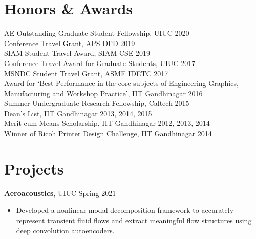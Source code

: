 \documentclass[margin]{res}
\begin{document}
\begin{resume}
\section{\large Honors \& Awards}
AE Outstanding Graduate Student Fellowship, UIUC \hfill 2020\vspace{0.1cm}\\
Conference Travel Grant, APS DFD \hfill 2019\vspace{0.1cm}\\
SIAM Student Travel Award, SIAM CSE \hfill 2019\vspace{0.1cm}\\
Conference Travel Award for Graduate Students, UIUC \hfill 2017\vspace{0.1cm}\\
MSNDC Student Travel Grant, ASME IDETC \hfill 2017\vspace{0.1cm}\\
Award for `Best Performance in the core subjects of Engineering Graphics, Manufacturing and Workshop Practice', IIT Gandhinagar \hfill 2016\vspace{0.1cm}\\
Summer Undergraduate Research Fellowship, Caltech \hfill 2015\vspace{0.1cm}\\
Dean's List, IIT Gandhinagar \hfill 2013, 2014, 2015\vspace{0.1cm}\\
Merit cum Means Scholarship, IIT Gandhinagar \hfill 2012, 2013, 2014\vspace{0.1cm}\\
Winner of Ricoh Printer Design Challenge, IIT Gandhinagar \hfill 2014


\section{\large Projects}

{\bf Aeroacoustics}, UIUC \hfill Spring 2021
\begin{itemize}
\item Developed a nonlinear modal decomposition framework to accurately represent transient fluid flows and extract meaningful flow structures using deep convolution autoencoders.
\end{itemize}


\end{resume}
\end{document}
